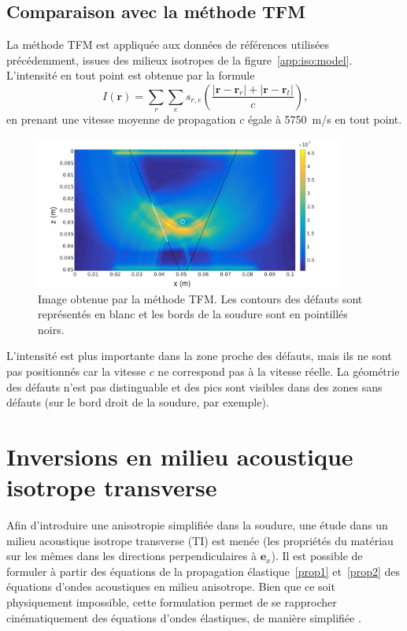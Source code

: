 \newpage

\subsection{Comparaison avec la méthode TFM}

La méthode TFM est appliquée aux données de références utilisées précédemment, issues des milieux isotropes de la figure~\ref{app:iso:model}. L'intensité en tout point est obtenue par la formule 
\begin{equation}
	I(\bm{r})= \displaystyle\sum_{r} \displaystyle\sum_{e} s_{r,e}\left( \frac{|\bm{r} - \bm{r}_r| + |\bm{r} - \bm{r}_t|}{c}\right) \text{,}
\end{equation}
en prenant une vitesse moyenne de propagation $c$ égale à 5750~m/s en tout point.

\begin{figure}[!h]
	\centering
	\includegraphics[height=5cm]{img/tfm_retouche.png}
	\caption{Image obtenue par la méthode TFM. Les contours des défauts sont représentés en blanc et les bords de la soudure sont en pointillés noirs.}
\end{figure}

L'intensité est plus importante dans la zone proche des défauts, mais ils ne sont pas positionnés car la vitesse $c$ ne correspond pas à la vitesse réelle. La géométrie des défauts n'est pas distinguable et des pics sont visibles dans des zones sans défauts (sur le bord droit de la soudure, par exemple).






\section{Inversions en milieu acoustique isotrope transverse }
Afin d'introduire une anisotropie simplifiée dans la soudure, une étude dans un milieu acoustique isotrope transverse (TI) est menée (les propriétés du matériau sur les mêmes dans les directions perpendiculaires à $\bm{e}_{x}$).
Il est possible de formuler à partir des équations de la propagation élastique~\ref{prop1} et~\ref{prop2} des équations d'ondes acoustiques en milieu anisotrope. Bien que ce soit physiquement impossible, cette formulation permet de se rapprocher cinématiquement des équations d'ondes élastiques, de manière simplifiée \citep{alkhalifah}.\\

